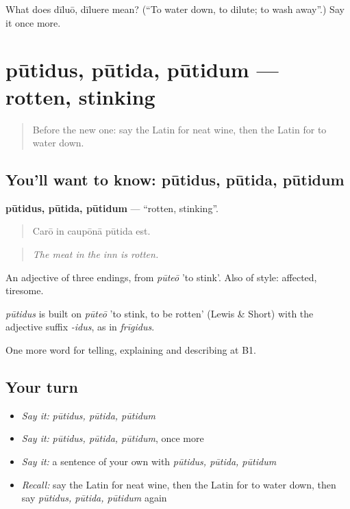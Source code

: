 \begin{tcolorbox}[breakable,colback=teal!4,colframe=teal!35!black,title={Before you move on}]
What does dīluō, dīluere mean? (\textquotedblleft{}To water down, to dilute; to wash away\textquotedblright{}.) Say it once more.
\end{tcolorbox}
\section[pūtidus, pūtida, pūtidum]{pūtidus, pūtida, pūtidum — rotten, stinking}

\label{lesson:LA-C449-putidus}



\begin{quote}
Before the new one: say the Latin for neat wine, then the Latin for to water down.
\end{quote}

\subsection*{You'll want to know: pūtidus, pūtida, pūtidum}
\textbf{pūtidus, pūtida, pūtidum} — \textquotedblleft{}rotten, stinking\textquotedblright{}.

\begin{quote}
Carō in caupōnā pūtida est.
\end{quote}

\begin{quote}
\emph{The meat in the inn is rotten.}
\end{quote}

An adjective of three endings, from \emph{pūteō} 'to stink'. Also of style: affected, tiresome.

\begin{cousinweb}
\emph{pūtidus} is built on \emph{pūteō} 'to stink, to be rotten' (Lewis \& Short) with the adjective suffix \emph{-idus}, as in \emph{frīgidus}.
\end{cousinweb}

\begin{grammarlens}[title={What you've built}]
One more word for telling, explaining and describing at B1.
\end{grammarlens}

\subsection*{Your turn}
\begin{itemize}
\raggedright
  \item \emph{Say it:} \emph{pūtidus, pūtida, pūtidum}
  \item \emph{Say it:} \emph{pūtidus, pūtida, pūtidum}, once more
  \item \emph{Say it:} a sentence of your own with \emph{pūtidus, pūtida, pūtidum}
  \item \emph{Recall:} say the Latin for neat wine, then the Latin for to water down, then say \emph{pūtidus, pūtida, pūtidum} again
\end{itemize}

